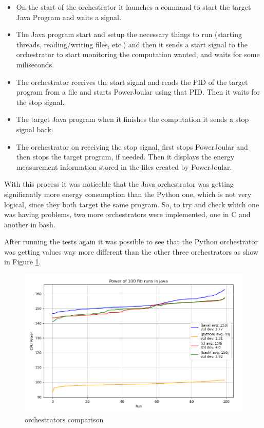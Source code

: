 \documentclass[sigplan]{acmart}
\begin{document}
\begin{itemize}
  \item On the start of the orchestrator it launches a command to start the target Java Program and waits a signal.
  \item The Java program start and setup the necessary things to run (starting threads, reading/writing files, etc.) and then it sends a start signal to the orchestrator to start monitoring the computation wanted, and waits for some miliseconds. 
  \item The orchestrator receives the start signal and reads the PID of the target program from a file and starts PowerJoular using that PID. Then it waits for the stop signal.
  \item The target Java program when it finishes the computation it sends a stop signal back.
  \item The orchestrator on receiving the stop signal, first stops PowerJoular and then stops the target program, if needed. Then it displays the energy measurement information stored in the files created by PowerJoular. \\
\end{itemize}

With this process it was noticeble that the Java orchestrator was getting significantly more energy consumption than the Python one, which is not very logical, since they both target the same program. So, to try and check which one was having problems, two more orchestrators were implemented, one in C and another in bash.

After running the tests again it was possible to see that the Python orchestrator was getting values way more different than the other three orchestrators as show in Figure \ref{fig:4_orchs_comparison}.

\begin{figure}%
  \centering
  \includegraphics[width = 0.5 \textwidth]{figures/4_orchestrators_comparison.png}
  \caption{orchestrators comparison}
  \label{fig:4_orchs_comparison}
\end{figure}
\end{document}
